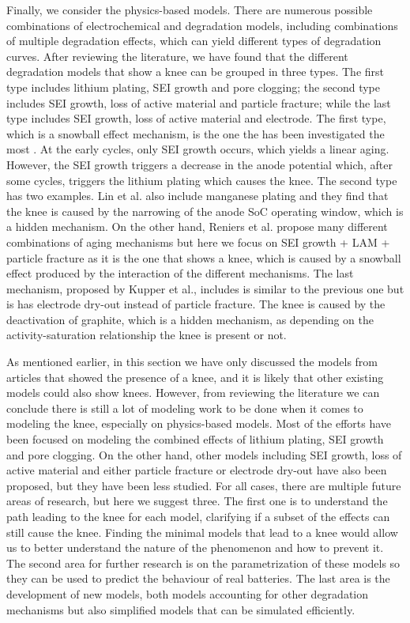 \documentclass[journal=jpclcd,manuscript=article]{achemso}
\begin{document}
Finally, we consider the physics-based models. There are numerous possible combinations of electrochemical and degradation models, including combinations of multiple degradation effects, which can yield different types of degradation curves.\cite{reniers_review_2019} After reviewing the literature, we have found that the different degradation models that show a knee can be grouped in three types. The first type includes lithium plating, SEI growth and pore clogging; the second type includes SEI growth, loss of active material and particle fracture; while the last type includes SEI growth, loss of active material and electrode. The first type, which is a snowball effect mechanism, is the one the has been investigated the most \cite{yang_modeling_2017,yang_understanding_2018,muller_model-based_2019,atalay_theory_2020,keil_electrochemical_2020}. At the early cycles, only SEI growth occurs, which yields a linear aging. However, the SEI growth triggers a decrease in the anode potential which, after some cycles, triggers the lithium plating which causes the knee. The second type has two examples. Lin et al. \cite{lin_comprehensive_2013} also include manganese plating and they find that the knee is caused by the narrowing of the anode SoC operating window, which is a hidden mechanism. On the other hand, Reniers et al. \cite{reniers_review_2019} propose many different combinations of aging mechanisms but here we focus on SEI growth + LAM + particle fracture as it is the one that shows a knee, which is caused by a snowball effect produced by the interaction of the different mechanisms. The last mechanism, proposed by Kupper et al.,\cite{kupper_end--life_2018} includes is similar to the previous one but is has electrode dry-out instead of particle fracture. The knee is caused by the deactivation of graphite, which is a hidden mechanism, as depending on the activity-saturation relationship the knee is present or not.

As mentioned earlier, in this section we have only discussed the models from articles that showed the presence of a knee, and it is likely that other existing models could also show knees. However, from reviewing the literature we can conclude there is still a lot of modeling work to be done when it comes to modeling the knee, especially on physics-based models. Most of the efforts have been focused on modeling the combined effects of lithium plating, SEI growth and pore clogging. On the other hand, other models including SEI growth, loss of active material and either particle fracture or electrode dry-out have also been proposed, but they have been less studied. For all cases, there are multiple future areas of research, but here we suggest three. The first one is to understand the path leading to the knee for each model, clarifying if a subset of the effects can still cause the knee. Finding the minimal models that lead to a knee would allow us to better understand the nature of the phenomenon and how to prevent it. The second area for further research is on the parametrization of these models so they can be used to predict the behaviour of real batteries. The last area is the development of new models, both models accounting for other degradation mechanisms but also simplified models that can be simulated efficiently.
\end{document}

